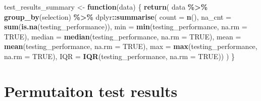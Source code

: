 \documentclass[
]{book}
\newenvironment{Shaded}{\begin{snugshade}}{\end{snugshade}}
\newcommand{\AttributeTok}[1]{\textcolor[rgb]{0.13,0.29,0.53}{#1}}
\newcommand{\ConstantTok}[1]{\textcolor[rgb]{0.56,0.35,0.01}{#1}}
\newcommand{\ControlFlowTok}[1]{\textcolor[rgb]{0.13,0.29,0.53}{\textbf{#1}}}
\newcommand{\FunctionTok}[1]{\textcolor[rgb]{0.13,0.29,0.53}{\textbf{#1}}}
\newcommand{\NormalTok}[1]{#1}
\newcommand{\OtherTok}[1]{\textcolor[rgb]{0.56,0.35,0.01}{#1}}
\newcommand{\SpecialCharTok}[1]{\textcolor[rgb]{0.81,0.36,0.00}{\textbf{#1}}}
\begin{document}
\begin{Shaded}
\begin{Highlighting}[]
\NormalTok{test\_results\_summary }\OtherTok{\textless{}{-}} \ControlFlowTok{function}\NormalTok{(data) \{}
    \FunctionTok{return}\NormalTok{(}
\NormalTok{        data }\SpecialCharTok{\%\textgreater{}\%}
        \FunctionTok{group\_by}\NormalTok{(selection) }\SpecialCharTok{\%\textgreater{}\%}
\NormalTok{        dplyr}\SpecialCharTok{::}\FunctionTok{summarise}\NormalTok{(}
            \AttributeTok{count =} \FunctionTok{n}\NormalTok{(),}
            \AttributeTok{na\_cnt =} \FunctionTok{sum}\NormalTok{(}\FunctionTok{is.na}\NormalTok{(testing\_performance)),}
            \AttributeTok{min =} \FunctionTok{min}\NormalTok{(testing\_performance, }\AttributeTok{na.rm =} \ConstantTok{TRUE}\NormalTok{),}
            \AttributeTok{median =} \FunctionTok{median}\NormalTok{(testing\_performance, }\AttributeTok{na.rm =} \ConstantTok{TRUE}\NormalTok{),}
            \AttributeTok{mean =} \FunctionTok{mean}\NormalTok{(testing\_performance, }\AttributeTok{na.rm =} \ConstantTok{TRUE}\NormalTok{),}
            \AttributeTok{max =} \FunctionTok{max}\NormalTok{(testing\_performance, }\AttributeTok{na.rm =} \ConstantTok{TRUE}\NormalTok{),}
            \AttributeTok{IQR =} \FunctionTok{IQR}\NormalTok{(testing\_performance, }\AttributeTok{na.rm =} \ConstantTok{TRUE}\NormalTok{))}
\NormalTok{    )}
\NormalTok{\}}
\end{Highlighting}
\end{Shaded}

\hypertarget{permutaiton-test-results}{%
\section{Permutaiton test results}\label{permutaiton-test-results}}
\end{document}
